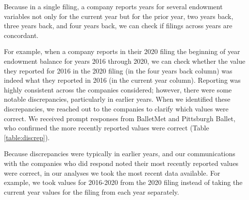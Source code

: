 \documentclass[Dance Data
Project,article,submit,moreauthors,pdftex]{mdpi}
\begin{document}
Because in a single filing, a company reports years for several
endowment variables not only for the current year but for the prior
year, two years back, three years back, and four years back, we can
check if filings across years are concordant.

For example, when a company reports in their 2020 filing the beginning
of year endowment balance for years 2016 through 2020, we can check
whether the value they reported for 2016 in the 2020 filing (in the four
years back column) was indeed what they reported in 2016 (in the current
year column). Reporting was highly consistent across the companies
considered; however, there were some notable discrepancies, particularly
in earlier years. When we identified these discrepancies, we reached out
to the companies to clarify which values were correct. We received
prompt responses from BalletMet and Pittsburgh Ballet, who confirmed the
more recently reported values were correct (Table \ref{table:discrep}).

Because discrepancies were typically in earlier years, and our
communications with the companies who did respond noted their most
recently reported values were correct, in our analyses we took the most
recent data available. For example, we took values for 2016-2020 from
the 2020 filing instead of taking the current year values for the filing
from each year separately.
\end{document}
